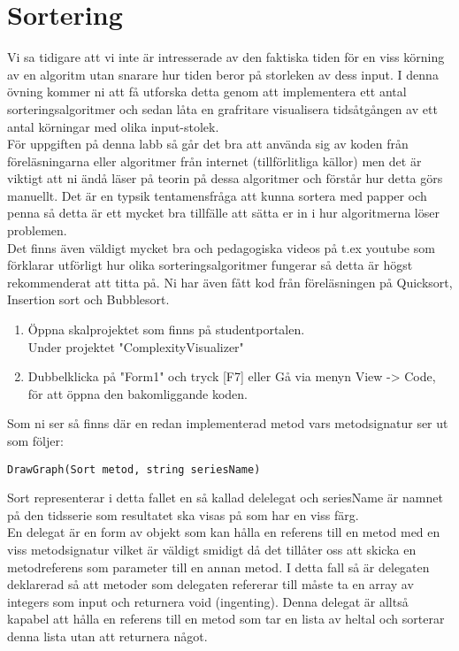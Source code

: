 \documentclass{article}
\begin{document}
   
\section*{Sortering}
Vi sa tidigare att vi inte är intresserade av den faktiska tiden för en viss körning av en algoritm utan snarare hur tiden beror på storleken av dess input. I denna övning kommer ni att få utforska detta genom att implementera ett antal sorteringsalgoritmer och sedan låta en grafritare visualisera tidsåtgången av ett antal körningar med olika input-stolek. \\För uppgiften på denna labb så går det bra att använda sig av koden från föreläsningarna eller algoritmer från internet (tillförlitliga källor) men det är viktigt att ni ändå läser på teorin på dessa algoritmer och förstår hur detta görs manuellt. Det är en typsik tentamensfråga att kunna sortera med papper och penna så detta är ett mycket bra tillfälle att sätta er in i hur algoritmerna löser problemen. \\Det finns även väldigt mycket bra och pedagogiska videos på t.ex youtube som förklarar utförligt hur olika sorteringsalgoritmer fungerar så detta är högst rekommenderat att titta på. Ni har även fått kod från föreläsningen på Quicksort, Insertion sort och Bubblesort. \\

\begin{enumerate}
\item Öppna skalprojektet som finns på studentportalen. \\Under projektet "ComplexityVisualizer" 
\item Dubbelklicka på "Form1" och tryck [F7] eller Gå via menyn View -> Code, för att öppna den bakomliggande koden.\end{enumerate}
Som ni ser så finns där en redan implementerad metod vars metodsignatur ser ut som följer: 
\begin{lstlisting}
DrawGraph(Sort metod, string seriesName) 
\end{lstlisting}

Sort representerar i detta fallet en så kallad delelegat och seriesName är namnet på den tidsserie som resultatet ska visas på som har en viss färg.\\

En delegat är en form av objekt som kan hålla en referens till en metod med en viss metodsignatur vilket är väldigt smidigt då det tillåter oss att skicka en metodreferens som parameter till en annan metod. 
I detta fall så är delegaten deklarerad så att metoder som delegaten refererar till måste ta en array av integers som input och returnera void (ingenting). Denna delegat är alltså kapabel att hålla en referens till en metod som tar en lista av heltal och sorterar denna lista utan att returnera något.
\end{document}

